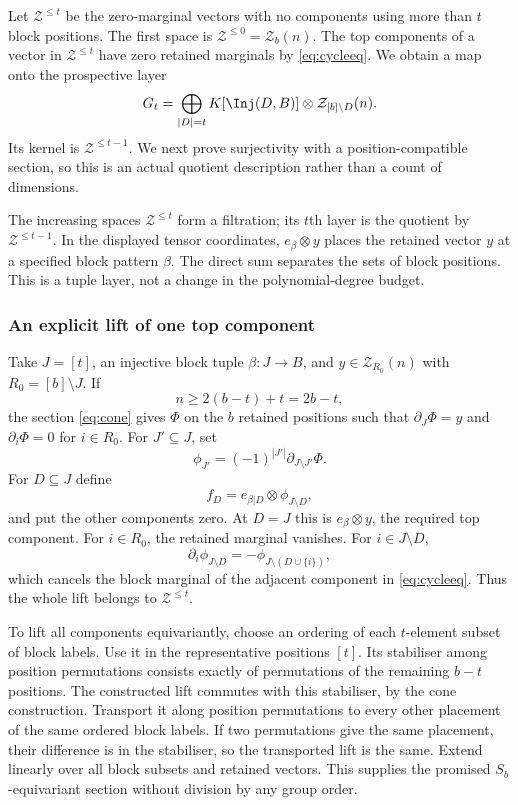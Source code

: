 Let $\mathcal Z^{\le t}$ be the zero-marginal vectors with no components using more than $t$ block positions. The first space is $\mathcal Z^{\le0}=\mathcal Z_b(n)$. The top components of a vector in $\mathcal Z^{\le t}$ have zero retained marginals by \eqref{eq:cycleeq}. We obtain a map onto the prospective layer
\[G_t=\bigoplus_{|D|=t}K[\Inj(D,B)]\otimes \mathcal Z_{[b]\setminus D}(n).
\]
Its kernel is $\mathcal Z^{\le t-1}$. We next prove surjectivity with a position-compatible section, so this is an actual quotient description rather than a count of dimensions.

The increasing spaces $\mathcal Z^{\le t}$ form a filtration; its
$t$th layer is the quotient by $\mathcal Z^{\le t-1}$. In the
displayed tensor coordinates, $e_\beta\otimes y$ places the retained
vector $y$ at a specified block pattern $\beta$. The direct sum separates
the sets of block positions. This is a tuple layer, not a change in
the polynomial-degree budget.

\subsubsection{An explicit lift of one top component}
Take $J=[t]$, an injective block tuple $\beta:J\to B$, and $y\in \mathcal Z_{R_0}(n)$ with $R_0=[b]\setminus J$. If
\[n\ge2(b-t)+t=2b-t,
\]
the section \eqref{eq:cone} gives $\Phi$ on the $b$ retained positions such that $\partial_J\Phi=y$ and $\partial_i\Phi=0$ for $i\in R_0$. For $J'\subseteq J$, set
\[\phi_{J'}=(-1)^{|J'|}\partial_{J\setminus J'}\Phi.
\]
For $D\subseteq J$ define
\[f_D=e_{\beta|D}\otimes\phi_{J\setminus D},
\]
and put the other components zero. At $D=J$ this is $e_\beta\otimes y$, the required top component. For $i\in R_0$, the retained marginal vanishes. For $i\in J\setminus D$,
\[\partial_i\phi_{J\setminus D}=-\phi_{J\setminus(D\cup\{i\})},
\]
which cancels the block marginal of the adjacent component in \eqref{eq:cycleeq}. Thus the whole lift belongs to $\mathcal Z^{\le t}$.

To lift all components equivariantly, choose an ordering of each $t$-element subset of block labels. Use it in the representative positions $[t]$. Its stabiliser among position permutations consists exactly of permutations of the remaining $b-t$ positions. The constructed lift commutes with this stabiliser, by the cone construction. Transport it along position permutations to every other placement of the same ordered block labels. If two permutations give the same placement, their difference is in the stabiliser, so the transported lift is the same. Extend linearly over all block subsets and retained vectors. This supplies the promised $S_b$-equivariant section without division by any group order.

